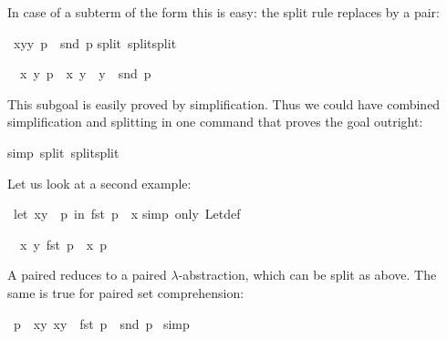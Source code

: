 \begin{isabellebody}
\begin{isamarkuptext}
In case of a subterm of the form  this is easy: the split
rule  replaces  by a pair:%
%
\end{isamarkuptext}%
\ {\isachardoublequote}{\isacharparenleft}{\isasymlambda}{\isacharparenleft}x{\isacharcomma}y{\isacharparenright}{\isachardot}y{\isacharparenright}\ p\ {\isacharequal}\ snd\ p{\isachardoublequote}\isanewline
{}split\ split{\isacharunderscore}split{\isacharparenright}%
\begin{isamarkuptxt}%
\begin{isabelle}%
\ {}{\isachardot}\ {\isasymforall}x\ y{\isachardot}\ p\ {\isacharequal}\ {\isacharparenleft}x{\isacharcomma}\ y{\isacharparenright}\ {\isasymlongrightarrow}\ y\ {\isacharequal}\ snd\ p%
\end{isabelle}
This subgoal is easily proved by simplification. Thus we could have combined
simplification and splitting in one command that proves the goal outright:%
\end{isamarkuptxt}%
simp\ split{\isacharcolon}\ split{\isacharunderscore}split{\isacharparenright}%
\begin{isamarkuptext}%
Let us look at a second example:%
\end{isamarkuptext}%
\ {\isachardoublequote}let\ {\isacharparenleft}x{\isacharcomma}y{\isacharparenright}\ {\isacharequal}\ p\ in\ fst\ p\ {\isacharequal}\ x{\isachardoublequote}\isanewline
{}simp\ only{\isacharcolon}\ Let{\isacharunderscore}def{\isacharparenright}%
\begin{isamarkuptxt}%
\begin{isabelle}%
\ {}{\isachardot}\ {\isacharparenleft}{\isasymlambda}{\isacharparenleft}x{\isacharcomma}\ y{\isacharparenright}{\isachardot}\ fst\ p\ {\isacharequal}\ x{\isacharparenright}\ p%
\end{isabelle}
A paired  reduces to a paired $\lambda$-abstraction, which
can be split as above. The same is true for paired set comprehension:%
\end{isamarkuptxt}%
\ {\isachardoublequote}p\ {\isasymin}\ {\isacharbraceleft}{\isacharparenleft}x{\isacharcomma}y{\isacharparenright}{\isachardot}\ x{\isacharequal}y{\isacharbraceright}\ {\isasymlongrightarrow}\ fst\ p\ {\isacharequal}\ snd\ p{\isachardoublequote}\isanewline
{}\ simp%
\begin{isamarkuptxt}%

\end{isamarkuptxt}
\end{isabellebody}
